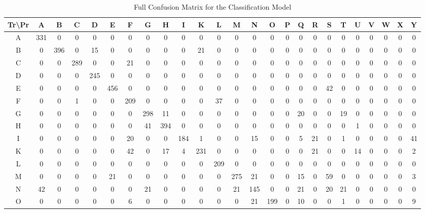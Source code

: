 \documentclass[times,final,english]{revdetua}
\begin{document}
\onecolumn  %
\appendix
\setlength{\tabcolsep}{2pt}  %
\begin{table}[ht]
\centering
\caption{Full Confusion Matrix for the Classification Model}
\label{tab:full_confusion_matrix}
\begin{tabular}{|c|c|c|c|c|c|c|c|c|c|c|c|c|c|c|c|c|c|c|c|c|c|c|c|c|}
\hline
\textbf{Tr\textbackslash  Pr} & A & B & C & D & E & F & G & H & I & K & L & M & N & O & P & Q & R & S & T & U & V & W & X & Y \\ \hline
A & 331 & 0 & 0 & 0 & 0 & 0 & 0 & 0 & 0 & 0 & 0 & 0 & 0 & 0 & 0 & 0 & 0 & 0 & 0 & 0 & 0 & 0 & 0 & 0 \\ \hline
B & 0 & 396 & 0 & 15 & 0 & 0 & 0 & 0 & 0 & 21 & 0 & 0 & 0 & 0 & 0 & 0 & 0 & 0 & 0 & 0 & 0 & 0 & 0 & 0 \\ \hline
C & 0 & 0 & 289 & 0 & 0 & 21 & 0 & 0 & 0 & 0 & 0 & 0 & 0 & 0 & 0 & 0 & 0 & 0 & 0 & 0 & 0 & 0 & 0 & 0 \\ \hline
D & 0 & 0 & 0 & 245 & 0 & 0 & 0 & 0 & 0 & 0 & 0 & 0 & 0 & 0 & 0 & 0 & 0 & 0 & 0 & 0 & 0 & 0 & 0 & 0 \\ \hline
E & 0 & 0 & 0 & 0 & 456 & 0 & 0 & 0 & 0 & 0 & 0 & 0 & 0 & 0 & 0 & 0 & 0 & 42 & 0 & 0 & 0 & 0 & 0 & 0 \\ \hline
F & 0 & 0 & 1 & 0 & 0 & 209 & 0 & 0 & 0 & 0 & 37 & 0 & 0 & 0 & 0 & 0 & 0 & 0 & 0 & 0 & 0 & 0 & 0 & 0 \\ \hline
G & 0 & 0 & 0 & 0 & 0 & 0 & 298 & 11 & 0 & 0 & 0 & 0 & 0 & 0 & 0 & 20 & 0 & 0 & 19 & 0 & 0 & 0 & 0 & 0 \\ \hline
H & 0 & 0 & 0 & 0 & 0 & 0 & 41 & 394 & 0 & 0 & 0 & 0 & 0 & 0 & 0 & 0 & 0 & 0 & 0 & 1 & 0 & 0 & 0 & 0 \\ \hline
I & 0 & 0 & 0 & 0 & 0 & 20 & 0 & 0 & 184 & 1 & 0 & 0 & 15 & 0 & 0 & 5 & 21 & 0 & 1 & 0 & 0 & 0 & 0 & 41 \\ \hline
K & 0 & 0 & 0 & 0 & 0 & 42 & 0 & 17 & 4 & 231 & 0 & 0 & 0 & 0 & 0 & 0 & 21 & 0 & 0 & 14 & 0 & 0 & 0 & 2 \\ \hline
L & 0 & 0 & 0 & 0 & 0 & 0 & 0 & 0 & 0 & 0 & 209 & 0 & 0 & 0 & 0 & 0 & 0 & 0 & 0 & 0 & 0 & 0 & 0 & 0 \\ \hline
M & 0 & 0 & 0 & 0 & 21 & 0 & 0 & 0 & 0 & 0 & 0 & 275 & 21 & 0 & 0 & 15 & 0 & 59 & 0 & 0 & 0 & 0 & 0 & 3 \\ \hline
N & 42 & 0 & 0 & 0 & 0 & 0 & 21 & 0 & 0 & 0 & 0 & 21 & 145 & 0 & 0 & 21 & 0 & 20 & 21 & 0 & 0 & 0 & 0 & 0 \\ \hline
O & 0 & 0 & 0 & 0 & 0 & 6 & 0 & 0 & 0 & 0 & 0 & 0 & 21 & 199 & 0 & 10 & 0 & 0 & 1 & 0 & 0 & 0 & 0 & 9 \\ \hline

\end{tabular}
\end{table}
\end{document}
